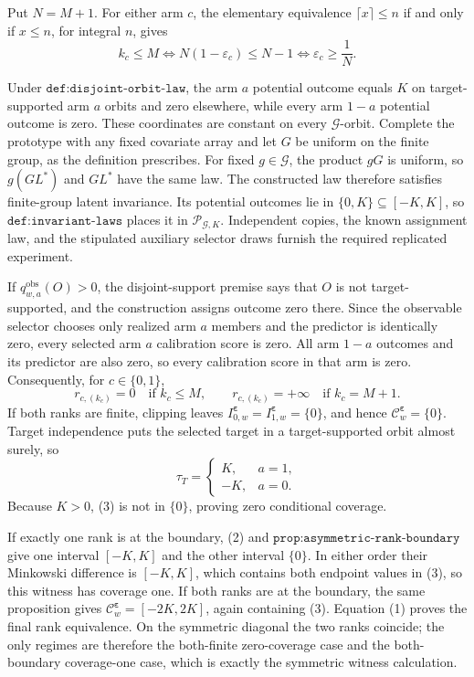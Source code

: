 Put \(N=M+1\). For either arm \(c\), the elementary equivalence \(\lceil x\rceil\le n\) if and only if \(x\le n\), for integral \(n\), gives
\[
k_c\le M\iff N(1-\varepsilon_c)\le N-1\iff\varepsilon_c\ge\frac1N.
\tag{1}
\]

Under \(\texttt{def:disjoint-orbit-law}\), the arm \(a\) potential outcome equals \(K\) on target-supported arm \(a\) orbits and zero elsewhere, while every arm \(1-a\) potential outcome is zero. These coordinates are constant on every \(\mathcal G\)-orbit. Complete the prototype with any fixed covariate array and let \(G\) be uniform on the finite group, as the definition prescribes. For fixed \(g\in\mathcal G\), the product \(gG\) is uniform, so \(g(GL^*)\) and \(GL^*\) have the same law. The constructed law therefore satisfies finite-group latent invariance. Its potential outcomes lie in \(\{0,K\}\subseteq[-K,K]\), so \(\texttt{def:invariant-laws}\) places it in \(\mathcal P_{\mathcal G,K}\). Independent copies, the known assignment law, and the stipulated auxiliary selector draws furnish the required replicated experiment.

If \(q^{\mathrm{obs}}_{w,a}(O)>0\), the disjoint-support premise says that \(O\) is not target-supported, and the construction assigns outcome zero there. Since the observable selector chooses only realized arm \(a\) members and the predictor is identically zero, every selected arm \(a\) calibration score is zero. All arm \(1-a\) outcomes and its predictor are also zero, so every calibration score in that arm is zero. Consequently, for \(c\in\{0,1\}\),
\[
r_{c,(k_c)}=0\quad\text{if }k_c\le M,\qquad r_{c,(k_c)}=+\infty\quad\text{if }k_c=M+1.
\tag{2}
\]
If both ranks are finite, clipping leaves \(I^{\boldsymbol\varepsilon}_{0,w}=I^{\boldsymbol\varepsilon}_{1,w}=\{0\}\), and hence \(\mathcal C^{\boldsymbol\varepsilon}_w=\{0\}\). Target independence puts the selected target in a target-supported orbit almost surely, so
\[
\tau_T=\begin{cases}K,&a=1,\\-K,&a=0.\end{cases}
\tag{3}
\]
Because \(K>0\), (3) is not in \(\{0\}\), proving zero conditional coverage.

If exactly one rank is at the boundary, (2) and \(\texttt{prop:asymmetric-rank-boundary}\) give one interval \([-K,K]\) and the other interval \(\{0\}\). In either order their Minkowski difference is \([-K,K]\), which contains both endpoint values in (3), so this witness has coverage one. If both ranks are at the boundary, the same proposition gives \(\mathcal C^{\boldsymbol\varepsilon}_w=[-2K,2K]\), again containing (3). Equation (1) proves the final rank equivalence. On the symmetric diagonal the two ranks coincide; the only regimes are therefore the both-finite zero-coverage case and the both-boundary coverage-one case, which is exactly the symmetric witness calculation.